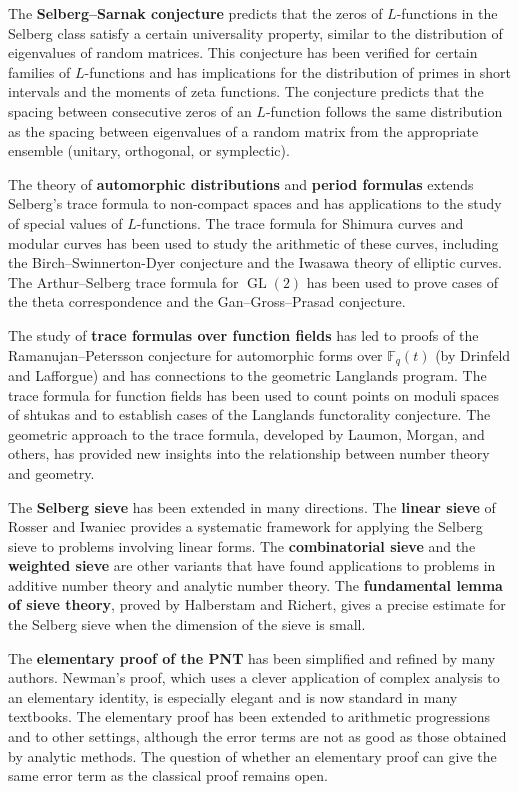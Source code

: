 The \textbf{Selberg--Sarnak conjecture} predicts that the zeros of $L$-functions in the Selberg class satisfy a certain universality property, similar to the distribution of eigenvalues of random matrices. This conjecture has been verified for certain families of $L$-functions and has implications for the distribution of primes in short intervals and the moments of zeta functions. The conjecture predicts that the spacing between consecutive zeros of an $L$-function follows the same distribution as the spacing between eigenvalues of a random matrix from the appropriate ensemble (unitary, orthogonal, or symplectic).

The theory of \textbf{automorphic distributions} and \textbf{period formulas} extends Selberg's trace formula to non-compact spaces and has applications to the study of special values of $L$-functions. The trace formula for Shimura curves and modular curves has been used to study the arithmetic of these curves, including the Birch--Swinnerton-Dyer conjecture and the Iwasawa theory of elliptic curves. The Arthur--Selberg trace formula for $\operatorname{GL}(2)$ has been used to prove cases of the theta correspondence and the Gan--Gross--Prasad conjecture.

The study of \textbf{trace formulas over function fields} has led to proofs of the Ramanujan--Petersson conjecture for automorphic forms over $\mathbb{F}_q(t)$ (by Drinfeld and Lafforgue) and has connections to the geometric Langlands program. The trace formula for function fields has been used to count points on moduli spaces of shtukas and to establish cases of the Langlands functorality conjecture. The geometric approach to the trace formula, developed by Laumon, Morgan, and others, has provided new insights into the relationship between number theory and geometry.

The \textbf{Selberg sieve} has been extended in many directions. The \textbf{linear sieve} of Rosser and Iwaniec provides a systematic framework for applying the Selberg sieve to problems involving linear forms. The \textbf{combinatorial sieve} and the \textbf{weighted sieve} are other variants that have found applications to problems in additive number theory and analytic number theory. The \textbf{fundamental lemma of sieve theory}, proved by Halberstam and Richert, gives a precise estimate for the Selberg sieve when the dimension of the sieve is small.

The \textbf{elementary proof of the PNT} has been simplified and refined by many authors. Newman's proof, which uses a clever application of complex analysis to an elementary identity, is especially elegant and is now standard in many textbooks. The elementary proof has been extended to arithmetic progressions and to other settings, although the error terms are not as good as those obtained by analytic methods. The question of whether an elementary proof can give the same error term as the classical proof remains open.


